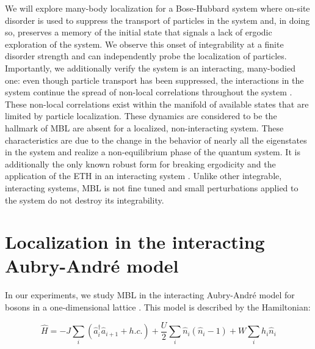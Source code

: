 We will explore many-body localization for a Bose-Hubbard system where on-site disorder is used to suppress the transport of particles in the system and, in doing so, preserves a memory of the initial state that signals a lack of ergodic exploration of the system. We observe this onset of integrability at a finite disorder strength and can independently probe the localization of particles. Importantly, we additionally verify the system is an interacting, many-bodied one: even though particle transport has been suppressed, the interactions in the system continue the spread of non-local correlations throughout the system \cite{Lukin2019}. These non-local correlations exist within the manifold of available states that are limited by particle localization. These dynamics are considered to be the hallmark of MBL are absent for a localized, non-interacting system. These characteristics are due to the change in the behavior of nearly all the eigenstates in the system and realize a non-equilibrium phase of the quantum system. It is additionally the only known robust form for breaking ergodicity and the application of the ETH in an interacting system \cite{Nandkishore2015}. Unlike other integrable, interacting systems, MBL is not fine tuned and small perturbations applied to the system do not destroy its integrability.


\section{Localization in the interacting Aubry-Andr\'e model}
\label{sec:ch5AAM}

In our experiments, we study MBL in the interacting Aubry-Andr\'e model for bosons in a one-dimensional lattice \cite{Huse2014,Aubry1980}. This model is described by the Hamiltonian:

\begin{equation}
\label{eqn:aaham}
\hat{H} = -J\sum_i \left ( \hat{a}_i^\dagger \hat{a}_{i+1} + h.c. \right ) + \frac{U}{2} \sum_i \hat{n}_i \left (\hat{n}_i - 1 \right ) + W \sum_i h_i \hat{n}_i
\end{equation}

